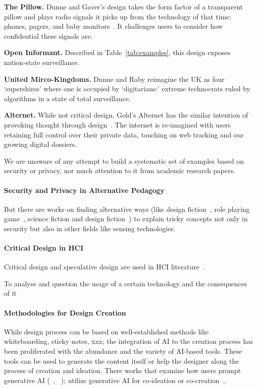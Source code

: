 \begin{compactlist}
\item \textbf{The Pillow.} Dunne and Gaver's design takes the form factor of a transparent pillow and plays radio signals it picks up from the technology of that time: \eg phones, pagers, and baby monitors~\cite{DuGa97}. It challenges users to consider how confidential these signals are.  
\item \textbf{Open Informant.} Described in Table~\ref{tab:examples}, this design exposes nation-state surveillance.
\item \textbf{United Mirco-Kingdoms.} Dunne and Raby reimagine the UK as four `supershires' where one is occupied by `digitarians:' extreme technocrats ruled by algorithms in a state of total surveillance.  
\item \textbf{Alternet.} While not critical design, Gold's Alternet has the similar intention of provoking thought through design~\cite{Gol14}. The internet is re-imagined with users retaining full control over their private data, touching on web tracking and our growing digital dossiers. 
\end{compactlist}

We are unaware of any attempt to build a systematic set of examples based on security or privacy, nor much attention to it from academic research papers.

\paragraph{Security and Privacy in Alternative Pedagogy}

But there are works on finding alternative ways (like design fiction~\cite{loureiro-koechlin_vision_2022}, role playing game~\cite{merrill_security_2020}, science fiction and design fiction~\cite{wong_real-fictional_2017}) to explain tricky concepts not only in security but also in other fields like sensing technologies.

\paragraph{Critical Design in HCI}

Critical design and speculative design are used in HCI literature~\cite{bardzell_what_2013}. 

To analyse and question the usage of a certain technology and the consequences of it~\cite{lawson_problematising_2015}

\paragraph{Methodologies for Design Creation} 
While design process can be based on well-established methods like whiteboarding, sticky notes, xxx; the integration of AI to the creation process has been proliferated with the abundance and the variety of AI-based tools. These tools can be used to generate the content itself or help the designer along the process of creation and ideation. There works that examine how users prompt generative AI (~\cite{sanchez_examining_2023}, ~\cite{chang_prompt_2023}); utilize generative AI for co-ideation or co-creation~\cite{tholander_design_2023},\cite{chiou_designing_2023}.


